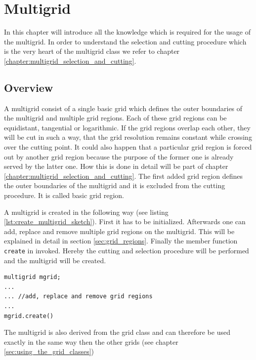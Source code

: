 \chapter{Multigrid} \label{chapter:multigrid_usage}
In this chapter will introduce all the knowledge which is required for the usage of the multigrid. In order to understand the selection and cutting procedure which is the very heart of the multigrid class we refer to chapter \ref{chapter:multigrid_selection_and_cutting}.

\section{Overview}
A multigrid consist of a single basic grid which defines the outer boundaries of the multigrid and multiple grid regions. Each of these grid regions can be equidistant, tangential or logarithmic. If the grid regions overlap each other, they will be cut in such a way, that the grid resolution remains constant while crossing over the cutting point. It could also happen that a particular grid region is forced out by another grid region because the purpose of the former one is already served by the latter one. How this is done in detail will be part of chapter \ref{chapter:multigrid_selection_and_cutting}. The first added grid region defines the outer boundaries of the multigrid and it is excluded from the cutting procedure. It is called basic grid region.

A multigrid is created in the following way (see listing \ref{lst:create_multigrid_sketch}). First it has to be initialized. Afterwards one can add, replace and remove multiple grid regions on the multigrid. This will be explained in detail in section \ref{sec:grid_regions}. Finally the member function \texttt{create} in invoked. Hereby the cutting and selection procedure will be performed and the multigrid will be created. 
\begin{lstlisting}[caption={Creating a multigrid},	label={lst:create_multigrid_sketch}]
multigrid mgrid;
... 
... //add, replace and remove grid regions
...
mgrid.create()
\end{lstlisting}
The multigrid is also derived from the grid class and can therefore be used exactly in the same way then the other grids (see chapter \ref{sec:using_the_grid_classes})

